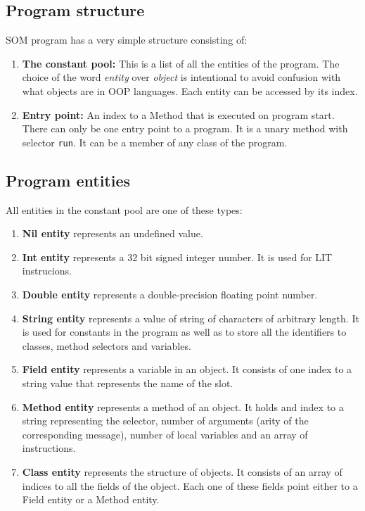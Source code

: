 \documentclass[thesis=M,english]{FITthesis}[2019/12/23]
\begin{document}
\subsection{Program structure}
SOM program has a very simple structure consisting of:
\begin{enumerate}
	\item \textbf{The constant pool:} This is a list of all the entities of the program. The choice of the word \textit{entity}
		over \textit{object} is intentional to avoid confusion with what objects are in OOP languages. Each entity can be accessed
		by its index.
	\item \textbf{Entry point: } An index to a Method that is executed on program start. There can only be one entry point to a
		program. It is a unary method with selector \texttt{run}. It can be a member of any class of the program.  
\end{enumerate}

\subsection{Program entities}
All entities in the constant pool are one of these types:
\begin{enumerate}
	\item \textbf{Nil entity} represents an undefined value.
	\item \textbf{Int entity} represents a 32 bit signed integer number. It is used for LIT instrucions.
	\item \textbf{Double entity} represents a double-precision floating point number.
	\item \textbf{String entity} represents a value of string of characters of arbitrary length. It is used for
		constants in the program as well as to store all the identifiers to classes, method selectors and variables.
	\item \textbf{Field entity} represents a variable in an object. It consists of one index to a string value that represents
		the name of the slot.
	\item \textbf{Method entity} represents a method of an object. It holds and index to a string representing the selector,
		number of arguments (arity of the corresponding message), number of local variables and an array of instructions.
	\item \textbf{Class entity} represents the structure of objects. It consists of an array of indices to all the fields
		of the object. Each one of these fields point either to a Field entity or a Method entity.
\end{enumerate}
\end{document}
